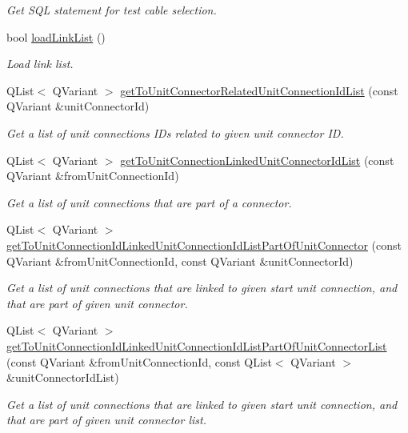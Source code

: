 \begin{DoxyCompactItemize}
\begin{DoxyCompactList}\small\item\em Get S\-Q\-L statement for test cable selection. \end{DoxyCompactList}\item 
bool \hyperlink{classmdt_tt_test_connection_cable_a6dc8270c14d7eb75297c814577b71bdd}{load\-Link\-List} ()
\begin{DoxyCompactList}\small\item\em Load link list. \end{DoxyCompactList}\item 
Q\-List$<$ Q\-Variant $>$ \hyperlink{classmdt_tt_test_connection_cable_a9612a35f206c5a2d2a63a2cd2370acab}{get\-To\-Unit\-Connector\-Related\-Unit\-Connection\-Id\-List} (const Q\-Variant \&unit\-Connector\-Id)
\begin{DoxyCompactList}\small\item\em Get a list of unit connections I\-Ds related to given unit connector I\-D. \end{DoxyCompactList}\item 
Q\-List$<$ Q\-Variant $>$ \hyperlink{classmdt_tt_test_connection_cable_a134b8c2dcc8f6b2a2be6ec0a729299df}{get\-To\-Unit\-Connection\-Linked\-Unit\-Connector\-Id\-List} (const Q\-Variant \&from\-Unit\-Connection\-Id)
\begin{DoxyCompactList}\small\item\em Get a list of unit connections that are part of a connector. \end{DoxyCompactList}\item 
Q\-List$<$ Q\-Variant $>$ \hyperlink{classmdt_tt_test_connection_cable_ad6b1873b36474edbff6c1f2eccb99cab}{get\-To\-Unit\-Connection\-Id\-Linked\-Unit\-Connection\-Id\-List\-Part\-Of\-Unit\-Connector} (const Q\-Variant \&from\-Unit\-Connection\-Id, const Q\-Variant \&unit\-Connector\-Id)
\begin{DoxyCompactList}\small\item\em Get a list of unit connections that are linked to given start unit connection, and that are part of given unit connector. \end{DoxyCompactList}\item 
Q\-List$<$ Q\-Variant $>$ \hyperlink{classmdt_tt_test_connection_cable_af3bafe5b616e9c143fb870bcfab2b6f9}{get\-To\-Unit\-Connection\-Id\-Linked\-Unit\-Connection\-Id\-List\-Part\-Of\-Unit\-Connector\-List} (const Q\-Variant \&from\-Unit\-Connection\-Id, const Q\-List$<$ Q\-Variant $>$ \&unit\-Connector\-Id\-List)
\begin{DoxyCompactList}\small\item\em Get a list of unit connections that are linked to given start unit connection, and that are part of given unit connector list. \end{DoxyCompactList}\item 

\end{DoxyCompactItemize}

